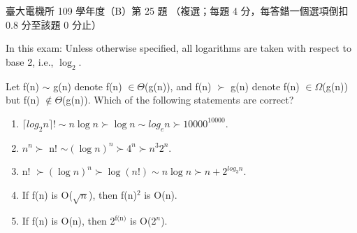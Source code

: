 \begin{pastexam}[label={px:ntu-109-ee-ds-25}]{臺大電機所 109 學年度（B）第 25 題}
（複選；每題 4 分，每答錯一個選項倒扣 0.8 分至該題 0 分止）

In this exam: Unless otherwise specified, all logarithms are taken with respect to base 2, i.e.,
$\log_2$.

Let f(n) $\sim$ g(n) denote f(n) $\in\Theta$(g(n)), and f(n) $\succ$ g(n) denote f(n) $\in\Omega$(g(n))
but f(n) $\notin\Theta$(g(n)). Which of the following statements are correct?
\begin{enumerate}[label=(\Alph*)]
\item $\lceil log_2 n\rceil! \sim n\log n \succ \log n \sim log_e n \succ 10000^{10000}$.
\item $n^n \succ$ n! $\sim (\log n)^n \succ 4^n \succ n^3 2^n$.
\item n! $\succ (\log n)^n \succ \log(n!) \sim n\log n \succ n + 2^{log_3 n}$.
\item If f(n) is O($\sqrt{n}$), then f(n)$^2$ is O(n).
\item If f(n) is O(n), then 2$^{\text{f(n)}}$ is O(2$^n$).
\end{enumerate}
\end{pastexam}

